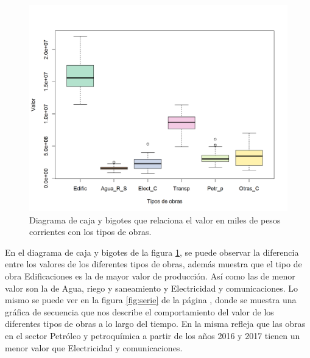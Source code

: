 \documentclass{article}
\begin{document}
\begin{center}
\begin{figure}[H]
\includegraphics[scale=0.8]{boxplot.png}
\caption{Diagrama de caja y bigotes que relaciona el valor en miles de pesos corrientes con los tipos de obras.}
\label{fig:sumario}
\end{figure}
\end{center}

En el diagrama de caja y bigotes de la figura \ref{fig:sumario}, se puede observar la diferencia entre los valores de los diferentes tipos de obras, además muestra que el tipo de obra Edificaciones es la de mayor valor de producción. Así como las de menor valor son la de Agua, riego y saneamiento y Electricidad y comunicaciones. Lo mismo se puede ver en la figura \ref{fig:serie} de la página \pageref{fig:serie}, donde se muestra una gráfica de secuencia que nos describe el comportamiento del valor de los diferentes tipos de obras a lo largo del tiempo. En la misma refleja que las obras en el sector Petróleo y petroquímica a partir de los años 2016 y 2017 tienen un menor valor que Electricidad y comunicaciones.
\end{document}
